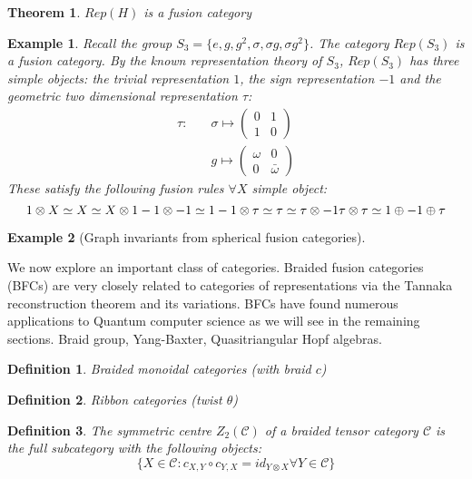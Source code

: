 \documentclass{article}
\newtheorem{definition}{Definition}
\newtheorem{example}{Example}
\newtheorem{theorem}{Theorem}
\begin{document}
\begin{theorem}
	$Rep(H)$ is a fusion category
\end{theorem}

\begin{example}
	Recall the group $S_3=\{e, g, g^2, \sigma, \sigma g, \sigma g^2 \}$. The category $Rep(S_3)$ is a fusion category. By the known representation theory of $S_3$, $Rep(S_3)$ has three simple objects: the trivial representation $1$, the sign representation $-1$ and the geometric two dimensional representation $\tau$:
	\begin{equation*}
	\begin{split}
	\tau : \quad & \sigma \mapsto \left( {\begin{array}{cc} 0 & 1 \\ 1 & 0 \end{array}}\right) \\
	& g \mapsto \left( {\begin{array}{cc} \omega & 0 \\ 0 & \bar{\omega} \end{array}}\right)
	\end{split}
	\end{equation*}
	These satisfy the following fusion rules $\forall X$ simple object:
	\begin{equation}
	1 \otimes X \simeq X \simeq X \otimes 1\\
	-1 \otimes -1 \simeq 1\\
	-1 \otimes \tau \simeq \tau \simeq \tau \otimes -1\\
	\tau \otimes \tau \simeq 1 \oplus -1 \oplus \tau\\
	\end{equation}
	
\end{example}

\begin{example}[Graph invariants from spherical fusion categories]
\end{example}

We now explore an important class of categories. Braided fusion categories (BFCs) are very closely related to categories of representations via the Tannaka reconstruction theorem and its variations. BFCs have found numerous applications to Quantum computer science as we will see in the remaining sections.
Braid group, Yang-Baxter, Quasitriangular Hopf algebras.
\begin{definition}
	Braided monoidal categories (with braid $c$)
\end{definition}
\begin{definition}
	Ribbon categories (twist $\theta$)
\end{definition}
\begin{definition}
	The symmetric centre $Z_2(\mathcal{C})$ of a braided tensor category $\mathcal{C}$ is the full subcategory with the following objects:
	$$ \{ X \in \mathcal{C} : c_{X,Y} \circ c_{Y,X} = id_{Y\otimes X} \forall Y \in \mathcal{C} \} $$
\end{definition}
\end{document}
